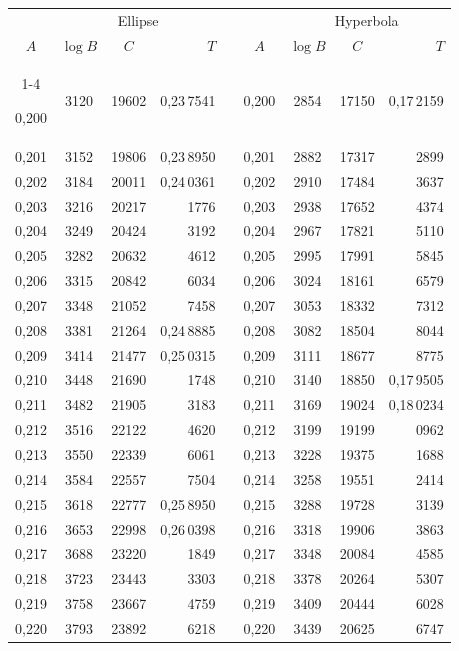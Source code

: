 \begin{tabular}{|c|c|c|r|@{}p{9pt}@{}|c|c|c|r|}
\hline
\rule{0pt}{8.5pt} & \multicolumn{3}{c|}{Ellipse} & & & \multicolumn{3}{c|}{Hyperbola} \\
\(A\) & \(\log B\) & \(C\) & \(T\) & & \(A\) & \(\log B\) & \(C\) & \(T\) \\
\cline{1-4}\cline{6-9}
\rule{0pt}{8.5pt}0,200 & 3120 & 19602 & 0,23\,7541 &  & 0,200 & 2854 & 17150 & 0,17\,2159 \\
0,201 & 3152 & 19806 & 0,23\,8950 &  & 0,201 & 2882 & 17317 & 2899 \\
0,202 & 3184 & 20011 & 0,24\,0361 &  & 0,202 & 2910 & 17484 & 3637 \\
0,203 & 3216 & 20217 & 1776 &  & 0,203 & 2938 & 17652 & 4374 \\
0,204 & 3249 & 20424 & 3192 &  & 0,204 & 2967 & 17821 & 5110 \\
0,205 & 3282 & 20632 & 4612 &  & 0,205 & 2995 & 17991 & 5845 \\[3pt]
0,206 & 3315 & 20842 & 6034 &  & 0,206 & 3024 & 18161 & 6579 \\
0,207 & 3348 & 21052 & 7458 &  & 0,207 & 3053 & 18332 & 7312 \\
0,208 & 3381 & 21264 & 0,24\,8885 &  & 0,208 & 3082 & 18504 & 8044 \\
0,209 & 3414 & 21477 & 0,25\,0315 &  & 0,209 & 3111 & 18677 & 8775 \\
0,210 & 3448 & 21690 & 1748 &  & 0,210 & 3140 & 18850 & 0,17\,9505 \\[3pt]
0,211 & 3482 & 21905 & 3183 &  & 0,211 & 3169 & 19024 & 0,18\,0234 \\
0,212 & 3516 & 22122 & 4620 &  & 0,212 & 3199 & 19199 & 0962 \\
0,213 & 3550 & 22339 & 6061 &  & 0,213 & 3228 & 19375 & 1688 \\
0,214 & 3584 & 22557 & 7504 &  & 0,214 & 3258 & 19551 & 2414 \\
0,215 & 3618 & 22777 & 0,25\,8950 &  & 0,215 & 3288 & 19728 & 3139 \\[3pt]
0,216 & 3653 & 22998 & 0,26\,0398 &  & 0,216 & 3318 & 19906 & 3863 \\
0,217 & 3688 & 23220 & 1849 &  & 0,217 & 3348 & 20084 & 4585 \\
0,218 & 3723 & 23443 & 3303 &  & 0,218 & 3378 & 20264 & 5307 \\
0,219 & 3758 & 23667 & 4759 &  & 0,219 & 3409 & 20444 & 6028 \\
0,220 & 3793 & 23892 & 6218 &  & 0,220 & 3439 & 20625 & 6747 \\[3pt]

\end{tabular}
